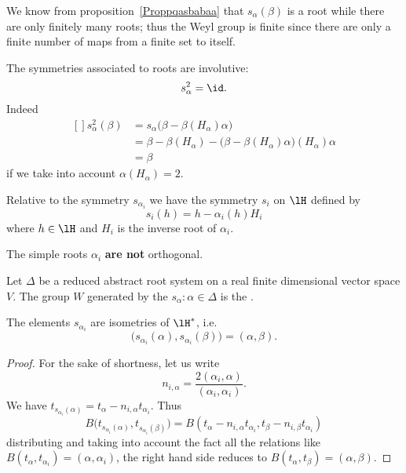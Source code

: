We know from proposition~\ref{Proppqasbabaa} that \( s_{\alpha}(\beta)\) is a root while there are only finitely many roots; thus the Weyl group is finite since there are only a finite number of maps from a finite set to itself.

The symmetries associated to roots are involutive:
\begin{equation}
    s_{\alpha}^2=\id.
\end{equation}
Indeed
\begin{equation}
    \begin{aligned}[]
        s^2_{\alpha}(\beta)&=s_{\alpha}\big( \beta-\beta(H_{\alpha})\alpha \big)\\
        &=\beta-\beta(H_{\alpha})-\big( \beta-\beta(H_{\alpha})\alpha \big)(H_{\alpha})\alpha\\
        &=\beta
    \end{aligned}
\end{equation}
if we take into account \( \alpha(H_{\alpha})=2\).

Relative to the symmetry \( s_{\alpha_i}\) we have the symmetry \( s_i\) on \( \lH\) defined by
\begin{equation}        \label{EqSymsiReltosalphai}
    s_i(h)=h-\alpha_i(h)H_i
\end{equation}
where \( h\in\lH\) and \( H_i\) is the inverse root of \( \alpha_i\).

\begin{remark}
    The simple roots \( \alpha_i\) {\bf are not} orthogonal.
\end{remark}

Let $\Delta$ be a reduced abstract root system on a real finite dimensional vector space $V$. The group $W$ generated by the $s_{\alpha}:\alpha\in\Delta$ is the .

\begin{proposition}     \label{PropWeylIsomalphai}
    The elements \( s_{\alpha_i}\) are isometries of \( \lH^*\), i.e.
    \begin{equation}
        \big( s_{\alpha_i}(\alpha),s_{\alpha_i}(\beta) \big)=(\alpha,\beta).
    \end{equation}
\end{proposition}

\begin{proof}
    For the sake of shortness, let us write
    \begin{equation}
        n_{i,\alpha}=\frac{ 2(\alpha_i,\alpha) }{ (\alpha_i,\alpha_i) }.
    \end{equation}
    We have \( t_{s_{\alpha_i}(\alpha)}=t_{\alpha}-n_{i,\alpha}t_{\alpha_i}\). Thus
    \begin{equation}
        B\big( t_{s_{\alpha_i}(\alpha)}, t_{s_{\alpha_i}(\beta)} \big)=B(t_{\alpha}-n_{i,\alpha}t_{\alpha_i},t_{\beta}-n_{i,\beta}t_{\alpha_i})
    \end{equation}
    distributing and taking into account the fact all the relations like \( B(t_{\alpha},t_{\alpha_i})=(\alpha,\alpha_i)\), the right hand side reduces to \( B(t_{\alpha},t_{\beta})=(\alpha,\beta)\).
\end{proof}


